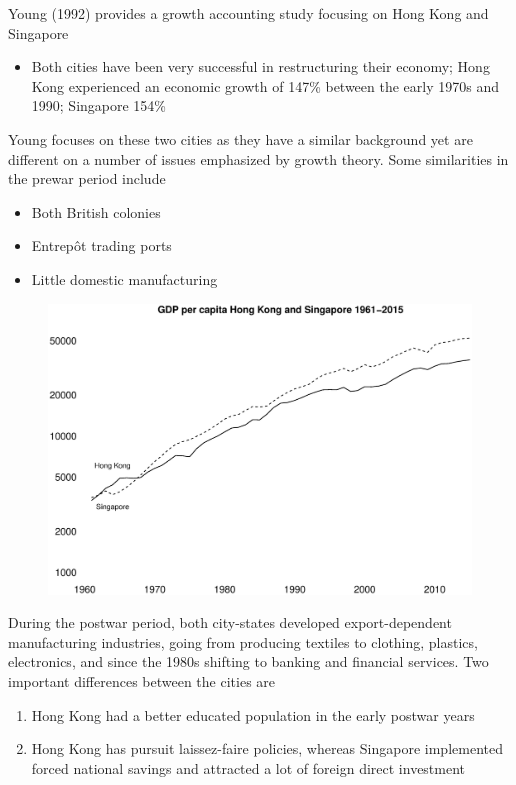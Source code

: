 \documentclass{beamer}
\begin{document}
\begin{frame}
 Young (1992) provides a growth accounting study focusing on Hong Kong and Singapore
 \begin{itemize}
   \item Both cities have been very successful in restructuring their economy; Hong Kong experienced an economic growth of 147\% between the early 1970s and 1990; Singapore 154\%
 \end{itemize}
 \medskip
 Young focuses on these two cities as they have a similar background yet are different on a number of issues emphasized by growth theory. 
  Some similarities in the prewar period include
  \begin{itemize}
    \item Both British colonies
    \item Entrep\^{o}t trading ports
  \item Little domestic manufacturing
  \end{itemize}
\end{frame}

\begin{frame}
  \begin{figure}
    \includegraphics[scale=.3]{hongkong_singapore.eps}
  \end{figure}
\end{frame}


\begin{frame}
  During the postwar period, both city-states developed export-dependent manufacturing industries, going from producing textiles to clothing, plastics, electronics, and since the 1980s shifting to banking and financial services.
  Two important differences between the cities are
\begin{enumerate}
  \item Hong Kong had a better educated population in the early postwar years
  \item Hong Kong has pursuit laissez-faire policies, whereas Singapore implemented forced national savings and attracted a lot of foreign direct investment
\end{enumerate}
\end{frame}
\end{document}
